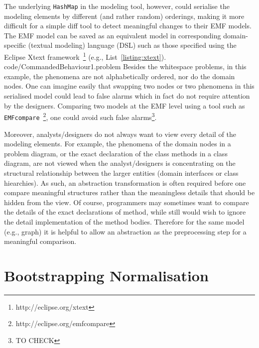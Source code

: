 \documentclass[10pt, conference, compsocconf]{IEEEtran}
\begin{document}
The underlying {\tt HashMap} in the modeling tool, however, could serialise the modeling elements by different (and rather random) orderings, making it more difficult for a simple diff tool to detect meaningful changes to their EMF models. The EMF model can be saved as an equivalent model in corresponding domain-specific (textual modeling) language (DSL) such as those specified using the Eclipse Xtext framework~\footnote{http://eclipse.org/xtext} (e.g., List~\ref{listing:xtext}). 
  {code/CommandedBehaviour1.problem}
Besides the whitespace problems, in this example, the phenomena are not alphabetically ordered, nor do the domain nodes. 
One can imagine easily that swapping two nodes or two phenomena in this serialised model could lead to false alarms which in fact do not require attention by the designers. Comparing two models at the EMF level using a tool such as {\tt EMFcompare}~\footnote{http://eclipse.org/emfcompare}, one could avoid such false alarms\footnote{TO CHECK}.

Moreover, analysts/designers do not always want to view every detail of the modeling elements. For example, the phenomena of the domain nodes in a problem diagram, or the exact declaration of the class methods in a class diagram, are not viewed when the analyst/designers is concentrating on the structural relationship between the larger entities (domain interfaces or class hiearchies). As such, an abstraction transformation is often required before one compare meaningful structures rather than the meaningless details that should be hidden from the view. Of course, programmers may sometimes want to compare the details of the exact declarations of method, while still would wish to ignore the detail implementation of the method bodies. Therefore for the same model (e.g., graph) it is helpful to allow an abstraction as the preprocessing step for a meaningful comparison.

\section{Bootstrapping Normalisation}\label{sec:approach}
\end{document}
